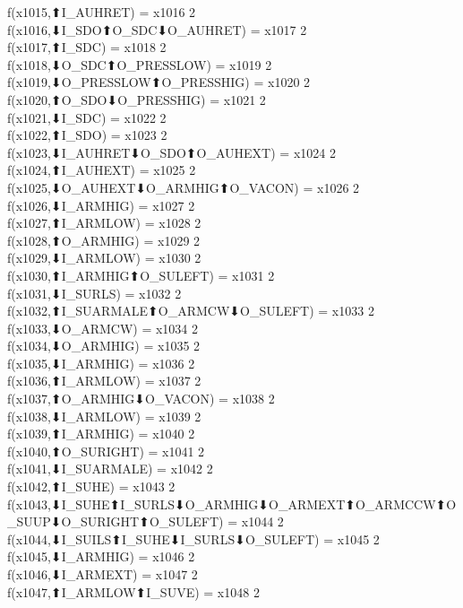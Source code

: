 f(x1015,⬆I_AUHRET) = x1016 {2} \\
f(x1016,⬇I_SDO⬆O_SDC⬇O_AUHRET) = x1017 {2} \\
f(x1017,⬆I_SDC) = x1018 {2} \\
f(x1018,⬇O_SDC⬆O_PRESSLOW) = x1019 {2} \\
f(x1019,⬇O_PRESSLOW⬆O_PRESSHIG) = x1020 {2} \\
f(x1020,⬆O_SDO⬇O_PRESSHIG) = x1021 {2} \\
f(x1021,⬇I_SDC) = x1022 {2} \\
f(x1022,⬆I_SDO) = x1023 {2} \\
f(x1023,⬇I_AUHRET⬇O_SDO⬆O_AUHEXT) = x1024 {2} \\
f(x1024,⬆I_AUHEXT) = x1025 {2} \\
f(x1025,⬇O_AUHEXT⬇O_ARMHIG⬆O_VACON) = x1026 {2} \\
f(x1026,⬇I_ARMHIG) = x1027 {2} \\
f(x1027,⬆I_ARMLOW) = x1028 {2} \\
f(x1028,⬆O_ARMHIG) = x1029 {2} \\
f(x1029,⬇I_ARMLOW) = x1030 {2} \\
f(x1030,⬆I_ARMHIG⬆O_SULEFT) = x1031 {2} \\
f(x1031,⬇I_SURLS) = x1032 {2} \\
f(x1032,⬆I_SUARMALE⬆O_ARMCW⬇O_SULEFT) = x1033 {2} \\
f(x1033,⬇O_ARMCW) = x1034 {2} \\
f(x1034,⬇O_ARMHIG) = x1035 {2} \\
f(x1035,⬇I_ARMHIG) = x1036 {2} \\
f(x1036,⬆I_ARMLOW) = x1037 {2} \\
f(x1037,⬆O_ARMHIG⬇O_VACON) = x1038 {2} \\
f(x1038,⬇I_ARMLOW) = x1039 {2} \\
f(x1039,⬆I_ARMHIG) = x1040 {2} \\
f(x1040,⬆O_SURIGHT) = x1041 {2} \\
f(x1041,⬇I_SUARMALE) = x1042 {2} \\
f(x1042,⬆I_SUHE) = x1043 {2} \\
f(x1043,⬇I_SUHE⬆I_SURLS⬇O_ARMHIG⬇O_ARMEXT⬆O_ARMCCW⬆O_SUUP⬇O_SURIGHT⬆O_SULEFT) = x1044 {2} \\
f(x1044,⬇I_SUILS⬆I_SUHE⬇I_SURLS⬇O_SULEFT) = x1045 {2} \\
f(x1045,⬇I_ARMHIG) = x1046 {2} \\
f(x1046,⬇I_ARMEXT) = x1047 {2} \\
f(x1047,⬆I_ARMLOW⬆I_SUVE) = x1048 {2} \\
